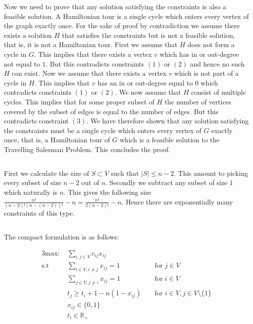 Now we need to prove that any solution satisfying the constraints is also a feasible solution. A Hamiltonian tour is a single cycle which enters every vertex of the graph exactly once. For the sake of proof by contradiction we assume there exists a solution $H$ that satisfies the constraints but is not a feasible solution, that is, it is not a Hamiltonian tour. First we assume that $H$ does not form a cycle in $G$. This implies that there exists a vertex $v$ which has in or out-degree not equal to $1$. But this contradicts constraints $(1)$ or $(2)$ and hence no such $H$ can exist. Now we assume that there exists a vertex $v$ which is not part of a cycle in $H$. This implies that $v$ has an in or out-degree equal to $0$ which contradicts constraints $(1)$ or $(2)$. We now assume that $H$ consist of multiple cycles. This implies that for some proper subset of $H$ the number of vertices covered by the subset of edges is equal to the number of edges. But this contradicts constraint $(3)$. We have therefore shown that any solution satisfying the constraints must be a single cycle which enters every vertex of $G$ exactly once, that is, a Hamiltonian tour of $G$ which is a feasible solution to the Travelling Salesman Problem. This concludes the proof.

\subsection{}  %
First we calculate the size of $S \subset V \text{ such that } |S| \leq n - 2$. This amount to picking every subset of size $n-2$ out of $n$. Secondly we subtract any subset of size $1$ which naturally is $n$. This gives the following size $\frac{n!}{(n-2)! (n - (n-2))!}-n = \frac{n!}{2 (n-2)!}-n$. Hence there are exponentially many constraints of this type. 


\subsection{} %

The compact formulation is as follows:

\begin{alignat}{3}
	\text{max: }    & \sum_{i,j \in V} c_{ij} x_{ij}\\
	\text{s.t }     & \sum_{i \in V, i \neq j} x_{ij} = 1  && \text{ for } j \in V\\
	& \sum_{j \in V, j \neq i} x_{ij} = 1  && \text{ for } i \in V\\
	& t_j \geq t_i + 1-n(1-x_{ij})  && \text{ for } i \in V, j \in V \setminus \{1\}\\
	& x_{ij} \in \{0,1\} \\
	& t_i \in \mathbb{R}_+ 
\end{alignat}

